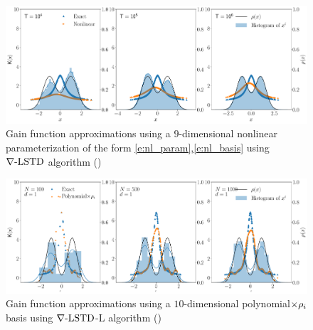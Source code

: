 \begin{figure}
	\includegraphics[width=6in]{images/Chap4_diff_td_nl}
	\caption[Performance comparison of $\gradTD$ with nonlinear parameterization]{Gain function approximations using a $9$-dimensional nonlinear parameterization of the form \eqref{e:nl_param},\eqref{e:nl_basis} using $\gradTD$ algorithm ()}
	\label{fig:diff_td_nl}
\end{figure}

\begin{figure}
	\includegraphics[width=6in]{images/Chap4_lang_td_wt_polynomials}
	\caption[Performance comparison of $\gradTD$-L with polynomial basis]{Gain function approximations using a $10$-dimensional polynomial$\times \rho_i$ basis using $\gradTD$-L algorithm ()}
	\label{fig:diff_td_lang_linear}
\end{figure}

